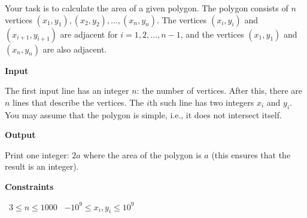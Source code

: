 Your task is to calculate the area of a given polygon.
The polygon consists of $n$ vertices $(x_1,y_1),(x_2,y_2),\dots,(x_n,y_n)$. The vertices $(x_i,y_i)$ and $(x_{i+1},y_{i+1})$ are adjacent for $i=1,2,\dots,n-1$, and the vertices $(x_1,y_1)$ and $(x_n,y_n)$ are also adjacent.

\vspace{0.3cm}\noindent\textbf{Input}

The first input line has an integer $n$: the number of vertices.
After this, there are $n$ lines that describe the vertices. The $i$th such line has two integers $x_i$ and $y_i$.
You may assume that the polygon is simple, i.e., it does not intersect itself.

\vspace{0.3cm}\noindent\textbf{Output}

Print one integer: $2a$ where the area of the polygon is $a$ (this ensures that the result is an integer).

\vspace{0.3cm}\noindent\textbf{Constraints}

\textbullet\ $3 \le n \le 1000$
\textbullet\ $-10^9 \le x_i, y_i \le 10^9$